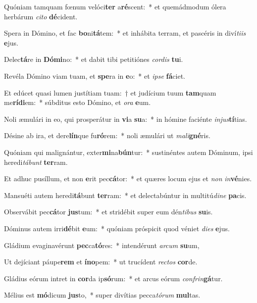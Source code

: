 \item Quóniam tamquam fœnum velóci\textbf{ter} a\textbf{ré}scent:~* et quemádmodum ólera herbárum \textit{ci}\textit{to} \textbf{dé}cident.
\item Spera in Dómino, et fac \textbf{bo}ni\textbf{tá}tem:~* et inhábita terram, et pascéris in diví\textit{ti}\textit{is} \textbf{e}jus.
\item Delec\textbf{tá}re in \textbf{Dó}\textbf{mi}no:~* et dabit tibi petitiónes \textit{cor}\textit{dis} \textbf{tu}i.
\item Revéla Dómino viam tuam, et \textbf{spe}ra in \textbf{e}o:~* et \textit{ip}\textit{se} \textbf{fá}ciet.
\item Et edúcet quasi lumen justítiam tuam:~† et judícium tuum \textbf{tam}quam me\textbf{rí}\textbf{di}em:~* súbditus esto Dómino, et \textit{o}\textit{ra} \textbf{e}um.
\item Noli æmulári in eo, qui prosperátur in \textbf{vi}a \textbf{su}a:~* in hómine faciénte \textit{in}\textit{jus}\textbf{tí}tias.
\item Désine ab ira, et dere\textbf{lín}que fu\textbf{ró}rem:~* noli æmulári ut \textit{ma}\textit{li}\textbf{gné}ris.
\item Quóniam qui malignántur, exter\textbf{mi}na\textbf{bún}tur:~* sustinéntes autem Dóminum, ipsi heredi\textit{tá}\textit{bunt} \textbf{ter}ram.
\item Et adhuc pusíllum, et non \textbf{e}rit pec\textbf{cá}tor:~* et quæres locum ejus et \textit{non} \textit{in}\textbf{vé}nies.
\item Mansuéti autem heredi\textbf{tá}bunt \textbf{ter}ram:~* et delectabúntur in multitú\textit{di}\textit{ne} \textbf{pa}cis.
\item Observábit pec\textbf{cá}tor \textbf{jus}tum:~* et stridébit super eum dén\textit{ti}\textit{bus} \textbf{su}is.
\item Dóminus autem irri\textbf{dé}bit \textbf{e}um:~* quóniam próspicit quod véniet \textit{di}\textit{es} \textbf{e}jus.
\item Gládium evaginavérunt \textbf{pec}ca\textbf{tó}res:~* intendérunt \textit{ar}\textit{cum} \textbf{su}um,
\item Ut dejíciant páupe\textbf{rem} et \textbf{ín}\textbf{o}pem:~* ut trucídent \textit{rec}\textit{tos} \textbf{cor}de.
\item Gládius eórum intret in \textbf{cor}da ip\textbf{só}rum:~* et arcus eórum \textit{con}\textit{frin}\textbf{gá}tur.
\item Mélius est \textbf{mó}dicum \textbf{jus}to,~* super divítias pecca\textit{tó}\textit{rum} \textbf{mul}tas.
